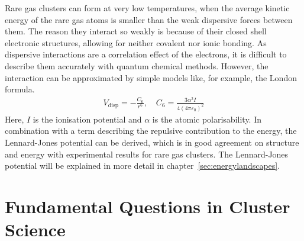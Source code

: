 Rare gas clusters can form at very low temperatures, when the average kinetic
energy of the rare gas atoms is smaller than the weak dispersive forces between
them. The reason they interact so weakly is because of their closed shell
electronic structures, allowing for neither covalent nor ionic bonding. As
dispersive interactions are a correlation effect of the electrons, it is
difficult to describe them accurately with quantum chemical methods. However,
the interaction can be approximated by simple models like, for example, the
London formula.
%
\begin{align}
    V_\text{disp}=-\frac{C_6}{r^6},\quad C_6=\frac{3\alpha^2I}{4\left(4\pi\varepsilon_0\right)^2}
\end{align}
%
Here, $I$ is the ionisation potential and $\alpha$ is the atomic polarisability.
In combination with a term describing the repulsive contribution to the energy,
the Lennard-Jones potential can be derived, which is in good agreement on
structure and energy with experimental results for rare gas clusters. The
Lennard-Jones potential will be explained in more detail in
chapter~\ref{sec:energylandscapes}.

\section{Fundamental Questions in Cluster Science}
\label{sec:FundamentalQuestionsinClusterScience}



